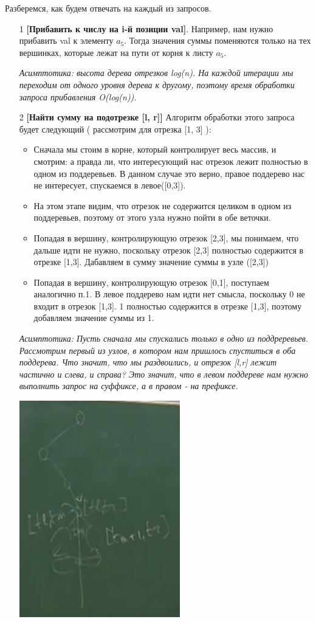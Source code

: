 Разберемся, как будем отвечать на каждый из запросов.
\begin{itemize}
    \item[1] \textbf{[Прибавить к числу на i-й позиции val]}. Например, нам нужно прибавить val к элементу $a_5$. Тогда значения суммы поменяются только на тех вершинках, которые лежат на пути от корня к листу $a_5$. 
    
    \textit{Асимптотика: высота дерева отрезков log(n). На каждой итерации мы переходим от одного уровня дерева к другому, поэтому время обработки запроса прибавления O(log(n)).}
    \item[2] \textbf{[Найти сумму на подотрезке [l, r]]} Алгоритм обработки этого запроса будет следующий ( рассмотрим для отрезка [1, 3] ):
    \begin{itemize}
    \item Сначала мы стоим в корне, который контролирует весь массив, и смотрим: а правда ли, что интересующий нас отрезок лежит полностью в одном из поддеревьев. В данном случае это верно, правое поддерево нас не интересует, спускаемся в левое([0,3]).
    \item На этом этапе видим, что отрезок не содержится целиком в одном из поддеревьев, поэтому от этого узла нужно пойти в обе веточки. 
    \item Попадая в вершину, контролирующую отрезок [2,3], мы понимаем, что дальше идти не нужно, поскольку отрезок [2,3] полностью содержится в отрезке [1,3]. Дабавляем в сумму значение суммы в узле ([2,3])
    \item Попадая в вершину, контролирующую отрезок [0,1], поступаем аналогично п.1. В левое поддерево нам идти нет смысла, поскольку 0 не входит в отрезок [1,3]. 1 полностью содержится в отрезке [1,3], поэтому добавляем значение суммы из 1. 
\end{itemize}

\textit{Асимптотика: Пусть сначала мы спускались только в одно из поддреревьев. Рассмотрим первый из узлов, в котором нам пришлось спуститься в оба поддерева. Что значит, что мы раздвоились, и отрезок [l,r] лежит частично и слева, и справа? Это значит, что в левом поддереве нам нужно выполнить запрос на суффиксе, а в правом - на префиксе.
}

\includegraphics[width = 7cm]{images/60-62_assimpt}


\end{itemize}
